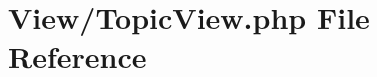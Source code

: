 \hypertarget{_topic_view_8php}{}\section{View/\+Topic\+View.php File Reference}
\label{_topic_view_8php}

